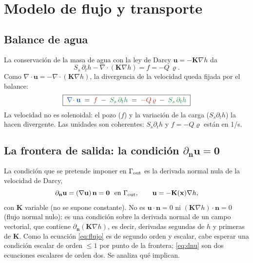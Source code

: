 \documentclass[11pt]{article}
\numberwithin{equation}{section}
\theoremstyle{plain}
\theoremstyle{definition}
\theoremstyle{remark}
\newcommand{\bu}{\mathbf{u}}
\newcommand{\bK}{\mathbf{K}}
\newcommand{\bn}{\mathbf{n}}
\newcommand{\bx}{\mathbf{x}}
\newcommand{\Nuc}{\varrho}                      %
\newcommand{\sumi}[1]{{\color{cSum}#1}}
\newcommand{\divi}[1]{{\color{cDiv}#1}}
\newcommand{\alm}[1]{{\color{cAlm}#1}}
\begin{document}
\section{Modelo de flujo y transporte}
\label{sec:modelo}

\subsection{Balance de agua}
La conservación de la masa de agua con la ley de Darcy $\bu=-\bK\nabla h$ da
\begin{equation}
S_s\,\partial_th-\nabla\!\cdot(\bK\nabla h)=f=-Q\,\Nuc .
\label{eq:flujo}
\end{equation}
Como $\nabla\!\cdot\bu=-\nabla\!\cdot(\bK\nabla h)$, la divergencia de la velocidad queda fijada por el balance:
\begin{equation}
\boxed{\;\divi{\nabla\!\cdot\bu}\;=\;\sumi{f}\;-\;\alm{S_s\,\partial_th}
\;=\;\sumi{-Q\,\Nuc}\;-\;\alm{S_s\,\partial_th}\;}
\label{eq:div_u}
\end{equation}
La velocidad no es solenoidal: el pozo ($f$) y la variación de la carga ($S_s\partial_th$) la hacen divergente.
Las unidades son coherentes: $S_s\partial_th$ y $f=-Q\Nuc$ están en 1/s.

\subsection{La frontera de salida: la condición \texorpdfstring{$\partial_{\bn}\bu=\mathbf 0$}{dn u = 0}}
\label{sec:salida}
La condición que se pretende imponer en $\Gamma_{\rm out}$ es la derivada normal nula de la velocidad de Darcy,
\begin{equation}
\partial_{\bn}\bu=(\nabla\bu)\,\bn=\mathbf 0\ \text{ en }\Gamma_{\rm out},\qquad \bu=-\bK(\bx)\nabla h,
\label{eq:dnu}
\end{equation}
con $\bK$ variable (no se supone constante). No es $\bu\cdot\bn=0$ ni $(\bK\nabla h)\cdot\bn=0$ (flujo normal nulo): es una condición sobre la
derivada normal de un campo vectorial, que contiene $\partial_{\bn}(\bK\nabla h)$, es decir, derivadas segundas de $h$ y primeras de $\bK$.
Como la ecuación \eqref{eq:flujo} es de segundo orden y escalar, cabe esperar una condición escalar de orden $\le1$ por punto de la frontera;
\eqref{eq:dnu} son dos ecuaciones escalares de orden dos. Se analiza qué implican.
\end{document}
